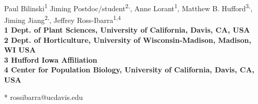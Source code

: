 \documentclass[10pt,letterpaper]{article}
\date{}
\begin{document}
\vspace*{0.35in}

\begin{flushleft}
{\Large
\textbf{}
}
\newline
\\
Paul Bilinski\textsuperscript{1}%
Jiming Postdoc/student\textsuperscript{2,},
Anne Lorant\textsuperscript{1},
Matthew B. Hufford\textsuperscript{3,},
Jiming Jiang\textsuperscript{2,},
Jeffrey Ross-Ibarra\textsuperscript{1,4}
\\
\bigskip
\bf{1} Dept. of Plant Sciences, University of California, Davis, CA, USA
\\
\bf{2} Dept. of Horticulture, University of Wisconsin-Madison, Madison, WI USA
\\
\bf{3} Hufford Iowa Affiliation
\\
\bf{4} Center for Population Biology, University of California, Davis, CA, USA
\\
\bigskip

% 
%





* rossibarra@ucdavis.edu

\end{flushleft}
\end{document}
